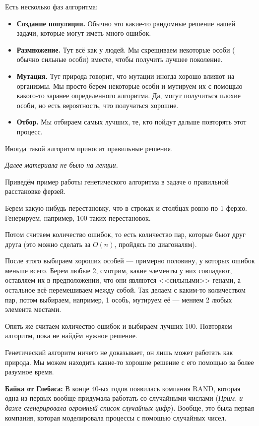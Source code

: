 \documentclass[a4paper, 12pt]{article}
\begin{document}
Есть несколько фаз алгоритма:

\begin{itemize}
  \item {\bf Создание популяции.} Обычно это какие-то рандомные решение нашей 
  задачи, которые могут иметь много ошибок.
  \item {\bf Размножение.} Тут всё как у людей. Мы скрещиваем некоторые особи (
  обычно сильные особи) вместе, чтобы получить лучшее поколение.
  \item {\bf Мутация.} Тут природа говорит, что мутации иногда хорошо влияют
  на организмы. Мы просто берем некоторые особи и мутируем их с помощью
  какого-то заранее определенного алгоритма. Да, могут получиться плохие
  особи, но есть вероятность, что получаться хорошие.
  \item {\bf Отбор.} Мы отбираем самых лучших, те, кто пойдут дальше повторять
  этот процесс.
\end{itemize}

Иногда такой алгоритм приносит правильные решения. 

{\it Далее материала не было на лекции.}

Приведём пример работы генетического алгоритма в задаче о правильной
расстановке ферзей.

Берем какую-нибудь перестановку, что в строках и столбцах ровно по 1 ферзю.
Генерируем, например, 100 таких перестановок.

Потом считаем количество ошибок, то есть количество пар, которые бьют друг
друга (это можно сделать за $O(n)$, пройдясь по диагоналям).

После этого выбираем хороших особей --- примерно половину, у которых ошибок
меньше всего. Берем любые 2, смотрим, какие элементы у них совпадают, оставляем
их в предположении, что они являются <<сильными>> генами, а остальное всё
перемешиваем между собой. Так делаем с каким-то количеством пар, потом
выбираем, например, 1 особь, мутируем её --- меняем 2 любых элемента местами.

Опять же считаем количество ошибок и выбираем лучших 100. Повторяем алгоритм,
пока не найдём нужное решение.

Генетический алгоритм ничего не доказывает, он лишь может работать как природа.
Мы можем находить какие-то хорошие решение с его помощью за более разумное время.

 {\bf Байка от Глебаса:}
  В конце 40-ых годов появилась компания RAND, которая одна из первых вообще
  придумала работать со случайными числами ({\it Прим. и даже сгенерировала 
  огромный список случайных цифр}). Вообще, это была первая компания, которая
  моделировала процессы с помощью случайных чисел.
\end{document}
